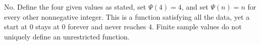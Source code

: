 No. Define the four given values as stated, set $\Psi(4)=4$, and set $\Psi(n)=n$ for every other nonnegative integer. This is a function satisfying all the data, yet a start at $0$ stays at $0$ forever and never reaches $4$. Finite sample values do not uniquely define an unrestricted function.
